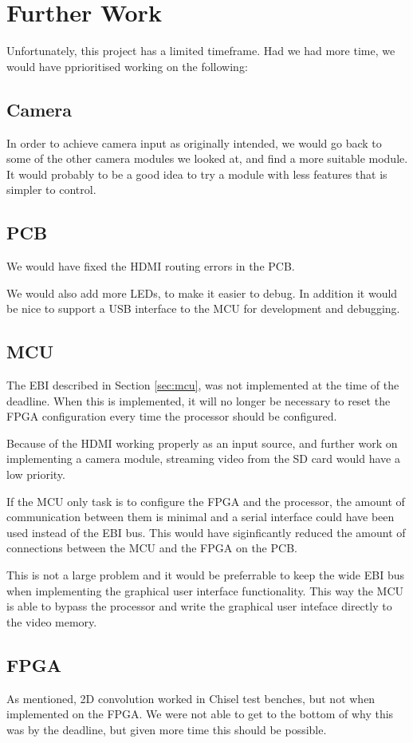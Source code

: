 \section{Further Work}

Unfortunately, this project has a limited timeframe.
Had we had more time, we would have pprioritised working on the following:

\subsection{Camera}

In order to achieve camera input as originally intended, we would go back to some of the other camera modules we looked at, and find a more suitable module.
It would probably to be a good idea to try a module with less features that is simpler to control.

\subsection{PCB}

We would have fixed the HDMI routing errors in the PCB.

We would also add more LEDs, to make it easier to debug.
In addition it would be nice to support a USB interface to the MCU for development and debugging.

\subsection{MCU}

The EBI described in Section \ref{sec:mcu}, was not implemented at the time of the deadline.
When this is implemented, it will no longer be necessary to reset the FPGA configuration every time the processor should be configured. 

Because of the HDMI working properly as an input source, and further work on implementing a camera module, streaming video from the SD card would have a low priority.

If the MCU only task is to configure the FPGA and the processor, the amount of communication between them is minimal and a serial interface could have been used instead of the EBI bus. This would have siginficantly reduced the amount of connections between the MCU and the FPGA on the PCB.

This is not a large problem and it would be preferrable to keep the wide EBI bus when implementing the graphical user interface functionality. This way the MCU is able to bypass the processor and write the graphical user inteface directly to the video memory.

\subsection{FPGA}

As mentioned, 2D convolution worked in Chisel test benches, but not when implemented on the FPGA.
We were not able to get to the bottom of why this was by the deadline, but given more time this should be possible.

